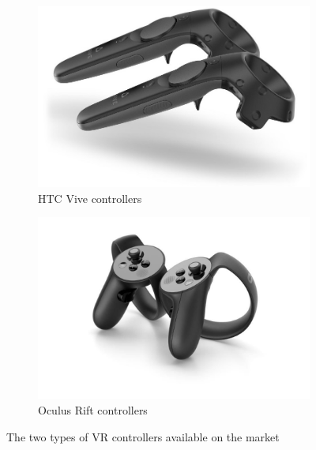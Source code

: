 \documentclass[12pt,a4paper,twoside]{report}
\begin{document}
\begin{figure}[h]
  \centering
  \begin{subfigure}{0.45\textwidth}
    \includegraphics[width=\linewidth]{img/Vive_controllers.jpg}
    \caption[]{HTC Vive controllers \footnotemark[1]}
    \label{fig:vive_controllers}
  \end{subfigure}
  \begin{subfigure}{0.45\textwidth}
    \includegraphics[width=\linewidth]{img/Oculus_controllers.jpg}
    \caption[]{Oculus Rift controllers \footnotemark[2]}
    \label{fig:leap_interaction}
  \end{subfigure}
  \caption{The two types of VR controllers available on the market}
  \label{mfig:vive_occulus}
\end{figure}

\end{document}

